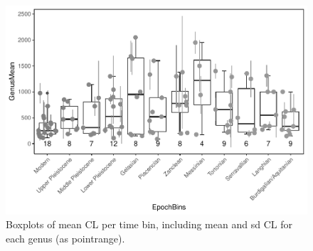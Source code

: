 \begin{figure}[H]
	\centering
	\includegraphics{MA_JJ_files/figure-latex/BPGBins-1.pdf}
	\caption{Boxplots of mean CL per time bin, including mean and sd CL for
		each genus (as pointrange).}
	\label{fig:boxBins}
\end{figure}



